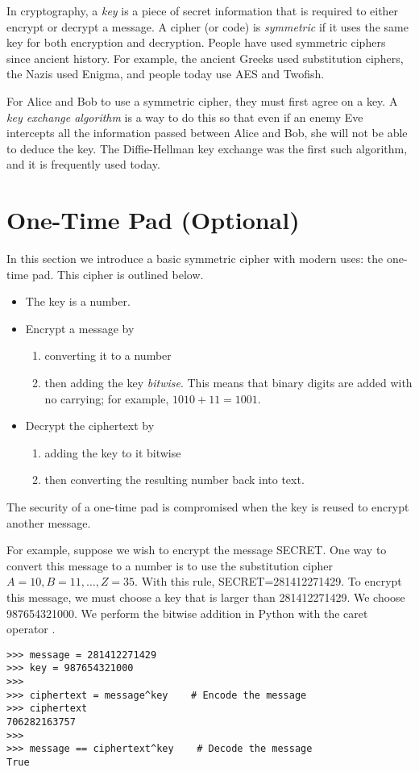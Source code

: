 \label{lab:DiffieHellman}


In cryptography, a \emph{key} is a piece of secret information that is required to either encrypt or decrypt a message.
A cipher (or code) is \emph{symmetric} if it uses the same key for both encryption and decryption.
People have used symmetric ciphers since ancient history.
For example, the ancient Greeks used substitution ciphers, the Nazis used Enigma, and people today use AES and Twofish.

For Alice and Bob to use a symmetric cipher, they must first agree on a key.
A \emph{key exchange algorithm} is a way to do this so that even if an enemy Eve intercepts all the information passed between Alice and Bob, she will not be able to deduce the key.
The Diffie-Hellman key exchange was the first such algorithm, and it is frequently used today.

\section*{One-Time Pad (Optional)}
In this section we introduce a basic symmetric cipher with modern uses: the one-time pad.
This cipher is outlined below.
\begin{itemize}
\item The key is a number.
\item Encrypt a message by 
\begin{enumerate}
\item converting it to a number
\item then adding the key \emph{bitwise}. This means that binary digits are added with no carrying; for example, $1010+11=1001$.
\end{enumerate}
\item Decrypt the ciphertext by 
\begin{enumerate}
\item adding the key to it bitwise
\item then converting the resulting number back into text.
\end{enumerate}
\end{itemize}
The security of a one-time pad is compromised when the key is reused to encrypt another message.

For example, suppose we wish to encrypt the message SECRET.
One way to convert this message to a number is to use the substitution cipher $A=10, B=11, \ldots, Z=35$.
With this rule, SECRET=281412271429.
To encrypt this message, we must choose a key that is larger than 281412271429.
We choose 987654321000. 
We perform the bitwise addition in Python with the caret operator \li{^}.
\begin{lstlisting}
>>> message = 281412271429
>>> key = 987654321000
>>>
>>> ciphertext = message^key    # Encode the message
>>> ciphertext
706282163757
>>>
>>> message == ciphertext^key    # Decode the message
True
\end{lstlisting}


